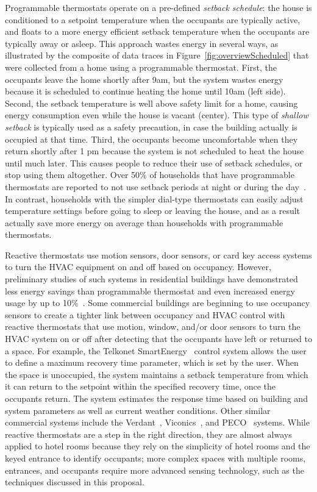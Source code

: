 Programmable thermostats operate on a pre-defined {\em setback schedule}: the
house is conditioned to a setpoint temperature when the occupants are typically
active, and floats to a more energy efficient setback temperature when the
occupants are typically away or asleep. This approach wastes energy in several
ways, as illustrated by the composite of data traces in
Figure~\ref{fig:overviewScheduled} that were collected from a home using a
programmable thermostat. First, the occupants leave the home shortly after 9am,
but the system wastes energy because it is scheduled to continue heating the
home until 10am (left side). Second, the setback temperature is well above
safety limit for a home, causing energy consumption even while the house is
vacant (center). This type of {\em shallow setback} is typically used as a
safety precaution, in case the building actually is occupied at that
time. Third, the occupants become uncomfortable when they return shortly after 1
pm because the system is not scheduled to heat the house until much later. This
causes people to reduce their use of setback schedules, or stop using them
altogether. Over 50\% of households that have programmable thermostats are
reported to not use setback periods at night or during the
day~\cite{sumfindings}. In contrast, households with the simpler dial-type
thermostats can easily adjust temperature settings before going to sleep or
leaving the house, and as a result actually save more energy on average than
households with programmable thermostats\cite{sumfindings, sachs04}.

Reactive thermostats use motion sensors, door sensors, or card key access
systems to turn the HVAC equipment on and off based on occupancy. However,
preliminary studies of such systems in residential buildings have demonstrated
less energy savings than programmable thermostat and even increased energy usage
by up to 10\%~\cite{gao2009self}. Some commercial buildings are beginning to use
occupancy sensors to create a tighter link between occupancy and HVAC control
with reactive thermostats that use motion, window, and/or door sensors to turn
the HVAC system on or off after detecting that the occupants have left or
returned to a space. For example, the Telkonet SmartEnergy~\cite{telkonet}
control system allows the user to define a maximum recovery time parameter,
which is set by the user. When the space is unoccupied, the system maintains a
setback temperature from which it can return to the setpoint within the
specified recovery time, once the occupants return. The system estimates the
response time based on building and system parameters as well as current weather
conditions. Other similar commercial systems include the
Verdant~\cite{prothermostats}, Viconics~\cite{vt7000}, and PECO~\cite{peco}
systems. While reactive thermostats are a step in the right direction, they are
almost always applied to hotel rooms because they rely on the simplicity of
hotel rooms and the keyed entrance to identify occupants; more complex spaces
with multiple rooms, entrances, and occupants require more advanced sensing
technology, such as the techniques discussed in this proposal.

